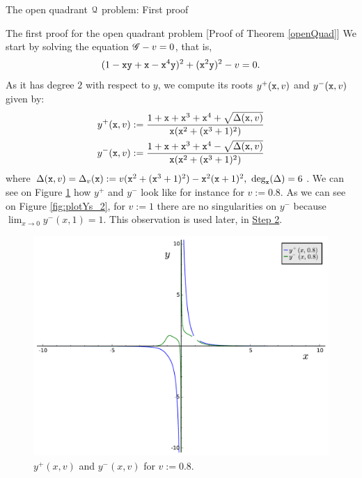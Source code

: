 \documentclass[11pt, a4paper, english, twoside, notitlepage, openright]{report}
\begin{document}
\begin{chapter}{The open quadrant $\mathcal{Q}$ problem: First proof}
\begin{section}{The first proof for the open quadrant problem} [Proof of Theorem \ref{openQuad}]
We start by solving the equation $\mathscr{G}-v=0$, that is, 
$$
(1-{\tt x}{\tt y}+{\tt x}-{\tt x}^4{\tt y})^2+({\tt x}^2{\tt y})^2-v=0.
$$ 
As it has degree $2$ with respect to $y$, we compute its roots $y^+({\tt x},v)$ and $y^-({\tt x},v)$ given by:
\begin{equation*}
\begin{aligned}
y^+({\tt x},v)&:=\frac{1+{\tt x}+{\tt x}^3+{\tt x}^4+\sqrt{\Delta({\tt x},v)}}{{\tt x}({\tt x}^2+({\tt x}^3+1)^2)}\\
y^-({\tt x},v)&:=\frac{1+{\tt x}+{\tt x}^3+{\tt x}^4-\sqrt{\Delta({\tt x},v)}}{{\tt x}({\tt x}^2+({\tt x}^3+1)^2)}\\
\end{aligned}
\end{equation*}
where $\Delta({\tt x},v)=\Delta_v({\tt x}):=v({\tt x}^2+({\tt x}^3+1)^2)-{\tt x}^2({\tt x}+1)^2,\ \text{deg}_{\tt x}(\Delta)=6$. We can see on Figure \ref{fig:plotYs_1} how $y^+$ and $y^-$ look like for instance for $v:=0.8$. As we can see on Figure \ref{fig:plotYs_2}, for $v:=1$ there are no singularities on $y^-$ because $\lim_{x\rightarrow0}y^-(x,1)=1$. This observation is used later, in \hyperref[step2]{Step 2}.
\begin{figure}[h]
\centering
\includegraphics[width=1\textwidth]{plots/ch1_06_sols.pdf}
\caption{$y^+(x,v)$ and $y^-(x,v)$ for $v:= 0.8$.\label{fig:plotYs_1}}
\end{figure}
\begin{figure}[h]
\centering

\end{figure}
\end{section}
\end{chapter}
\end{document}
